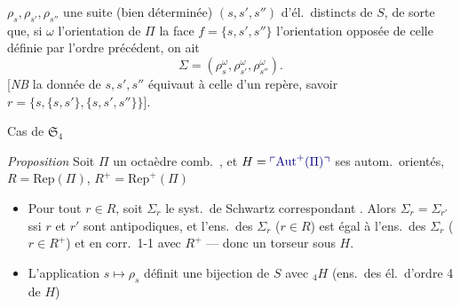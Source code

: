 \documentclass[11pt,a4paper]{article}
\begin{document}
\add{\ill{}}  
$\rho_s, \rho_{s'}, \rho_{s''}$ \struck{\ill{} \ill{}} une suite (bien
déterminée) $(s, s', s'')$ d'él.\ distincts de $S$, de sorte que, si
$\omega$  l'orientation de $\Pi$  
 la face $f = \{s, s', s''\}$ l'orientation opposée de
celle définie par l'ordre précédent, on ait
\[
\Sigma = (\rho_s^{\omega}, \rho_{s'}^{\omega}, \rho_{s''}^{\omega}).
\]
[\emph{NB} la donnée de $s, s', s''$ équivaut à celle d'un repère, savoir
$r = \{s, \{s, s'\}, \{s, s', s''\}\}$].

Cas de $\mathfrak{S}_4$

\emph{Proposition} Soit $\Pi$ un octaèdre comb.\ , et
$H = \add{\mathrm{Aut}^{+}(\Pi)}$  ses autom.\ orientés,
$R = \mathrm{Rep}(\Pi)$, $R^{+} = \mathrm{Rep}^{+}(\Pi)$
\begin{itemize}
\item[a)] Pour tout $r \in R$, soit $\Sigma_r$ le syst.\ de Schwartz
correspondant . Alors
$\Sigma_r = \Sigma_{r'}$ ssi $r$ et $r'$ sont antipodiques, et l'ens.\ des
$\Sigma_r$ ($r \in R$) est égal à l'ens.\ des $\Sigma_r$ ($r \in R^{+}$) et en
corr.\ 1-1 avec $R^{+}$ --- donc un torseur sous $H$.
\item[b)] L'application $s \mapsto \rho_s$ définit une bijection de $S$ avec
${}_4H$ (ens.\ des él.\ d'ordre 4 de $H$)
\end{itemize}
\end{document}

